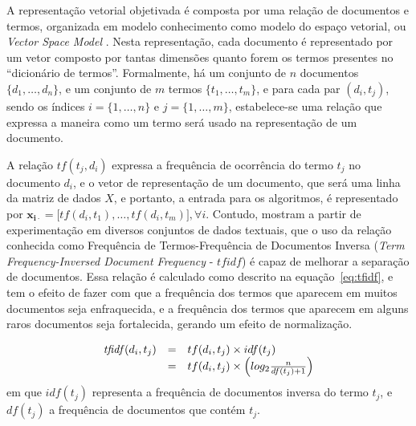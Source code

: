 \documentclass[
    12pt,                %
    oneside,            %
    a4paper,            %
    english,            %
    brazil                %
    ]{abntex2ppgsi}
\begin{document}

A representação vetorial objetivada é composta por uma relação de documentos e termos, organizada em modelo conhecimento como modelo do espaço vetorial, ou \textit{Vector Space Model} \cite{Salton1975,Sebastiani2002,Lops2011}.
Nesta representação, cada documento é representado por um vetor composto por tantas dimensões quanto forem os termos presentes no ``dicionário de termos''.
Formalmente, há um conjunto de $n$ documentos $\{ d_1, \dots, d_n \}$, e um conjunto de $m$ termos $\{ t_1, \dots, t_m \}$, e para cada par $(d_i, t_j)$, sendo os índices $i = \{1, \dots, n\}$ e $j = \{1, \dots, m\}$, estabelece-se uma relação que expressa a maneira como um termo será usado na representação de um documento.

A relação $\textit{tf}(t_j, d_i)$ expressa a frequência de ocorrência do termo $t_j$ no documento $d_i$, e o vetor de representação de um documento, que será uma linha da matriz de dados $X$, e portanto, a entrada para os algoritmos, é representado por $\mathbf{\mathbf{x}_{i \cdot}} = \big[ \textit{tf}(d_i, t_1), \dots, \textit{tf}(d_i, t_m) \big], \forall i$.
Contudo,  mostram a partir de experimentação em diversos conjuntos de dados textuais, que o uso da relação conhecida como Frequência de Termos-Frequência de Documentos Inversa (\textit{Term Frequency-Inversed Document Frequency} - $\textit{tfidf}$) é capaz de melhorar a separação de documentos.
Essa relação é calculado como descrito na equação~\ref{eq:tfidf}, e tem o efeito de fazer com que a frequência dos termos que aparecem em muitos documentos seja enfraquecida, e a frequência dos termos que aparecem em alguns raros documentos seja fortalecida, gerando um efeito de normalização.

\begin{equation}
\label{eq:tfidf}
    \begin{array}{lclcl}
        \text{\textit{tfidf}}(d_i, t_j) & = & tf(d_i, t_j) \times idf(t_j) \\
                                        & = & tf(d_i, t_j) \times \left( log_{2} \frac{n}{df(t_j) + 1} \right) \\
    \end{array}
\end{equation}
em que $idf(t_j)$ representa a frequência de documentos inversa do termo $t_j$, e $df(t_j)$ a frequência de documentos que contém $t_j$.
\end{document}
